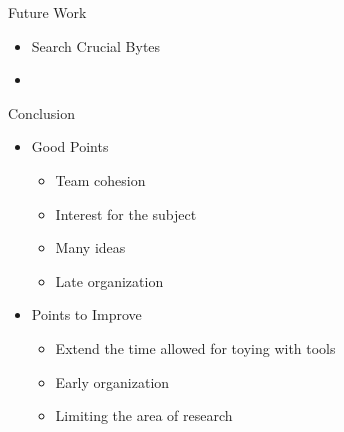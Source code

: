 \documentclass{beamer}
\newcounter{m} %
\newcounter{c} %
\begin{document}
\begin{frame}{Future Work}
\begin{itemize}
\item Search Crucial Bytes 
\item 
\end{itemize}

\end{frame}

\begin{frame}{Conclusion}
\begin{itemize}
\item Good Points
\begin{itemize}
\item Team cohesion 
\item Interest for the subject
\item Many ideas
\item Late organization
\end{itemize}

\item Points to Improve 
\begin{itemize}
\item Extend the time allowed for toying with tools
\item Early organization 
\item Limiting the area of research
\end{itemize}
\end{itemize}


\end{frame}
\end{document}
